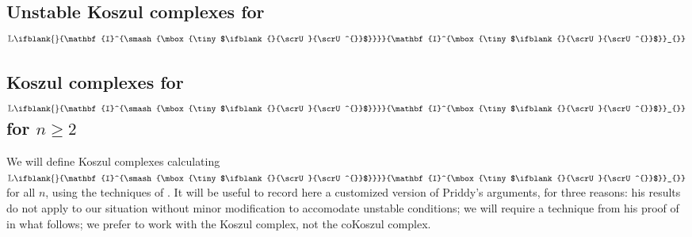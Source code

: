\documentclass[10pt]{article}
\newcommand{\LL}[1]{\ifblank{#1}{\scrK}{\scrK^{#1}}}
\newcommand{\nontop}[1]{\ifblank{#1}{\scrU}{\scrU^{#1}}}
\newcommand{\Ind}[2][]{\ifblank{#1}{\mathbf{I}^{\smash{\mbox{\tiny $#2$}}}}{\mathbf{I}^{\mbox{\tiny $#2$}}_{#1}}}%
\newcommand{\derived}{\mathbb{L}}
\renewcommand{\Q}{Q}
\newcommand{\minDim}{m}
\begin{document}
\begin{KoszulComplexes_n>1}
\section{Unstable Koszul complexes for $\derived\Ind{\nontop{}}$} \label{sectionOnUnstableKoszulComplexes}
\subsection{Koszul complexes for $\derived\Ind{\nontop{}}$ for $n\geq2$}
We will define Koszul complexes calculating $\derived\Ind{\nontop{}}$ for all $n$, using the techniques of \cite{PriddyKoszul.pdf}. It will be useful to record here a customized version of Priddy's arguments, for three reasons: his results do not apply to our situation without minor modification to accomodate unstable conditions; we will require a technique from his proof of \cite[Thm 5.3]{PriddyKoszul.pdf} in what follows; we prefer to work with the Koszul complex, not the coKoszul complex.



\end{KoszulComplexes_n>1}
\end{document}
